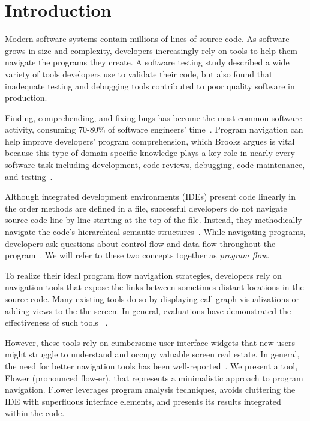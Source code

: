 \documentclass[conference]{IEEEtran}
\begin{document}



\IEEEpeerreviewmaketitle


\section{Introduction}
Modern software systems contain millions of lines of source code. 
As software grows in size and complexity, developers increasingly rely on tools to help them navigate the programs they create. 
A software testing study described a wide variety of tools developers use to validate their code, but also found that inadequate testing and debugging tools contributed to poor quality software in production\cite{NIST-02-3}.

Finding, comprehending, and fixing bugs has become the most common software activity, consuming 70-80\% of software engineers' time~\cite{Whyline}. 
Program navigation can help improve developers' program comprehension, which Brooks argues is vital because this type of domain-specific knowledge plays a key role in nearly every software task including development, code reviews, debugging, code maintenance, and testing~\cite{BrooksComprehension}. 

Although integrated development environments (IDEs) present code linearly in the order methods are defined in a file, successful developers do not navigate source code line by line starting at the top of the file. 
Instead, they methodically navigate the code's hierarchical semantic structures~\cite{robillard2004investigate}.
While navigating programs, developers ask questions about control flow and data flow throughout the program~\cite{latoza2010hard, Smith2015}. 
We will refer to these two concepts together as \textit{program flow}. 

To realize their ideal program flow navigation strategies, developers rely on navigation tools that expose the links between sometimes distant locations in the source code. 
Many existing tools do so by displaying call graph visualizations or adding views to the the screen.
In general, evaluations have demonstrated the effectiveness of such tools ~\cite{Reacher,Whyline,Relo,Stacksplorer}.

However, these tools rely on cumbersome user interface widgets that new users might struggle to understand and occupy valuable screen real estate.
In general, the need for better navigation tools has been well-reported~\cite{ko2006seekInfo}.
We present a tool, Flower (pronounced flow-er), that represents a minimalistic approach to program navigation.
Flower  leverages program analysis techniques, avoids cluttering the IDE with superfluous interface elements, and presents its results integrated within the code.
\end{document}
